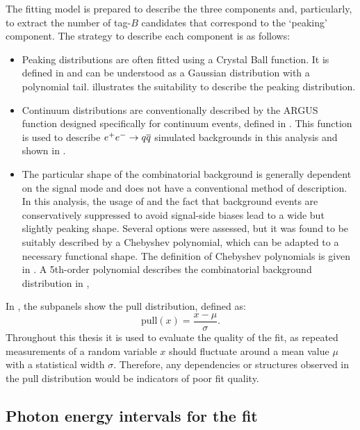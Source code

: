 The fitting model is prepared to describe the three components and, particularly, to extract the number of tag-$B$ candidates that correspond to the `peaking' component.
The strategy to describe each component is as follows:
\begin{itemize}
    \item Peaking \Mbc distributions are often fitted using a Crystal Ball function.
    It is defined in  and can be understood as a Gaussian distribution with a polynomial tail.
     illustrates the suitability to describe the peaking \Mbc distribution.
    \item Continuum \Mbc distributions are conventionally described by the ARGUS function designed specifically for continuum events, defined in .
    This function is used to describe $e^+e^-\rightarrow q\overline q$ simulated backgrounds in this analysis and shown in .
    \item The particular shape of the combinatorial \BB background is generally dependent on the signal mode and does not have a conventional method of description.
    In this analysis, the usage of \FEI and the fact that background events are conservatively suppressed to avoid signal-side biases lead to a wide but slightly peaking shape.
    Several options were assessed, but it was found to be suitably described by a Chebyshev polynomial, which can be adapted to a necessary functional shape.
    The definition of Chebyshev polynomials is given in .
    A 5th-order polynomial describes the combinatorial \BB background distribution in ,
\end{itemize}
In , the subpanels show the pull distribution, defined as:
\begin{equation}\label{eq:pull_distribution}
    \mathrm{pull}(x) = \frac{x-\mu}{\sigma}. 
\end{equation}
Throughout this thesis it is used to evaluate the quality of the fit, as repeated measurements of a random variable $x$ should fluctuate around a mean value $\mu$ with a statistical width $\sigma$.
Therefore, any dependencies or structures observed in the pull distribution would be indicators of poor fit quality. 

\subsection{Photon energy intervals for the fit}\label{sec:binning}

